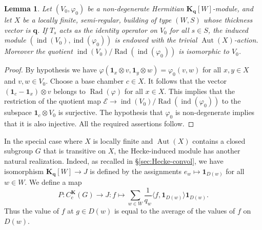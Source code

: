 \documentclass[12pt,a4paper]{amsproc}
\newtheorem{lemma}[theorem]{Lemma}
\theoremstyle{definition}
\DeclareMathOperator{\Aut}{Aut}
\DeclareMathOperator{\Ind}{ind}
\DeclareMathOperator{\Rad}{Rad}
\newcommand{\KK}{\mathbf K}
\newcommand{\one}{\mathbf 1}
\newcommand{\qq}{\mathbf q}
\begin{document}
\begin{lemma}\label{lem:trivial-induced}
Let   $(V_0, \varphi_0)$ be a non-degenerate Hermitian $\KK_\qq[W]$-module, and let $X$ be a locally finite, semi-regular, building of type $(W, S)$ whose thickness vector is $\qq$.  If $T_s$ acts as the identity operator on $V_0$ for all $s \in S$,  the induced module $(\Ind(V_0), \Ind(\varphi_0))$ is  endowed with the trivial $\Aut(X)$-action.  Moreover the quotient $\Ind(V_0)/\Rad(\Ind(\varphi_0))$ is isomorphic to $V_0$.
\end{lemma}
\begin{proof}
By hypothesis we have $\varphi(\one_x \otimes v , \one_y \otimes w) = \varphi_0(v, w)$ for all $x, y \in X$ and $v, w \in V_0$. Choose a base chamber $c \in X$. It follows that the vector $(\one_c -   \one_x) \otimes v$ belongs to $\Rad(\varphi)$ for all $x \in X$. This implies that the restriction of the quotient map $\mathscr E \to \Ind(V_0)/\Rad(\Ind(\varphi_0))$ to the subspace $\one_c \otimes V_0$ is surjective. The hypothesis that $\varphi_0$ is non-degenerate implies that it is also injective. All the required assertions follow. 
\end{proof}

	




In the special case where $X$ is locally finite and $\Aut(X)$ contains a closed subgroup $G$ that is transitive on $X$, the Hecke-induced module has another natural  realization. Indeed, as recalled in \S\ref{sec:Hecke-convol}, we have isomorphism $\KK_{\mathbf q}[W] \to J$  is defined by the assignments $e_w \mapsto \one_{D(w)}$ for all $w \in W$.  We define a map 
$$P \colon C^\KK_c(G) \to J : f \mapsto  \sum_{w \in W} \frac 1 {q_w}\langle f, \one_{D(w)} \rangle \one_{D(w)}.$$ 
Thus the value of $f$ at $g \in D(w)$ is equal to the average of the values of $f$ on $D(w)$. 
\end{document}
